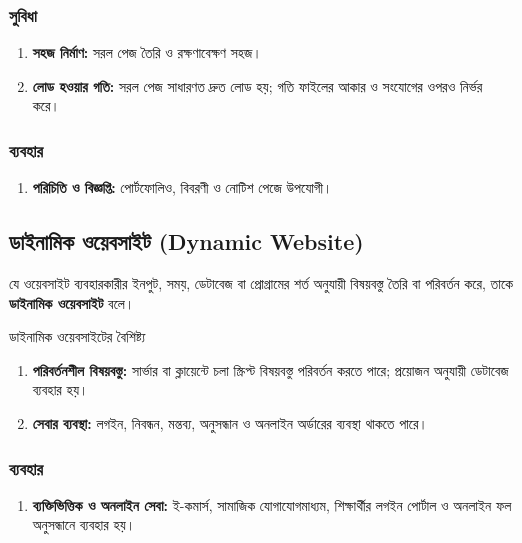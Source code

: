 \subsubsection{সুবিধা}
\begin{enumerate}
\item \textbf{সহজ নির্মাণ:} সরল পেজ তৈরি ও রক্ষণাবেক্ষণ সহজ।
\item \textbf{লোড হওয়ার গতি:} সরল পেজ সাধারণত দ্রুত লোড হয়; গতি ফাইলের আকার ও সংযোগের ওপরও নির্ভর করে।
\end{enumerate}
\subsubsection{ব্যবহার}
\begin{enumerate}
\item \textbf{পরিচিতি ও বিজ্ঞপ্তি:} পোর্টফোলিও, বিবরণী ও নোটিশ পেজে উপযোগী।
\end{enumerate}

\subsection{ডাইনামিক ওয়েবসাইট (Dynamic Website)}
\begin{definitionbox}{}
যে ওয়েবসাইট ব্যবহারকারীর ইনপুট, সময়, ডেটাবেজ বা প্রোগ্রামের শর্ত অনুযায়ী বিষয়বস্তু তৈরি বা পরিবর্তন করে, তাকে \textbf{ডাইনামিক ওয়েবসাইট} বলে।
\end{definitionbox}

\begin{keypointbox}{ডাইনামিক ওয়েবসাইটের বৈশিষ্ট্য}
\begin{enumerate}
\item \textbf{পরিবর্তনশীল বিষয়বস্তু:} সার্ভার বা ক্লায়েন্টে চলা স্ক্রিপ্ট বিষয়বস্তু পরিবর্তন করতে পারে; প্রয়োজন অনুযায়ী ডেটাবেজ ব্যবহার হয়।
\item \textbf{সেবার ব্যবস্থা:} লগইন, নিবন্ধন, মন্তব্য, অনুসন্ধান ও অনলাইন অর্ডারের ব্যবস্থা থাকতে পারে।
\end{enumerate}
\end{keypointbox}
\subsubsection{ব্যবহার}
\begin{enumerate}
\item \textbf{ব্যক্তিভিত্তিক ও অনলাইন সেবা:} ই-কমার্স, সামাজিক যোগাযোগমাধ্যম, শিক্ষার্থীর লগইন পোর্টাল ও অনলাইন ফল অনুসন্ধানে ব্যবহার হয়।
\end{enumerate}


